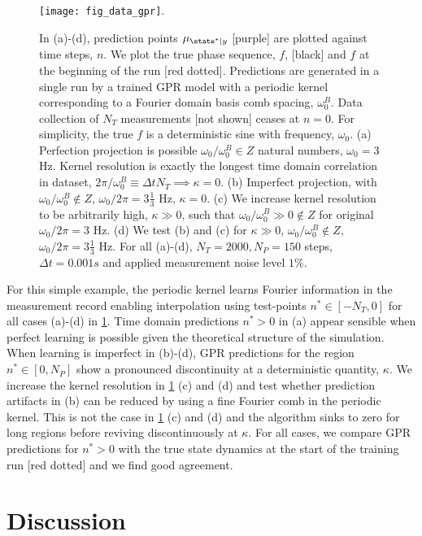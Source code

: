 \begin{figure}
    \texttt{[image: fig\_data\_gpr]}. 
    \caption{\label{fig:main:fig_data_gpr} In (a)-(d), prediction points $\mu_{\state^*|y}$ [purple] are plotted against time steps, $n$. We plot the true phase sequence,  $f$, [black] and  $f$ at the beginning of the run [red dotted]. Predictions are generated in a single run by a trained GPR model with a periodic kernel corresponding to a Fourier domain basis comb spacing, $\omega_0^B$. Data collection of $N_T$ measurements [not shown] ceases at $n=0$. For simplicity, the true $f$ is a deterministic sine with frequency, $\omega_0$. (a) Perfection projection is possible $\omega_0 / \omega_0^B \in Z$ natural numbers, $\omega_0 = 3$ Hz. Kernel resolution is exactly the longest time domain correlation in dataset, $2 \pi / \omega_0^B \equiv \Delta t N_T \implies \kappa = 0$.   (b) Imperfect projection, with $\omega_0 / \omega_0^B \notin Z$, $\omega_0 / 2 \pi = 3 \frac{1}{3}$ Hz, $\kappa=0$. (c) We increase kernel resolution to be arbitrarily high, $\kappa \gg 0 $, such that $\omega_0 / \omega_0^B \gg 0 \notin Z $ for original $ \omega_0 / 2 \pi = 3$ Hz. (d) We test (b) and (c) for $\kappa \gg0$, $ \omega_0 / \omega_0^B \notin Z$, $\omega_0 / 2 \pi = 3 \frac{1}{3}$ Hz. For all (a)-(d), $N_T = 2000, N_P = 150$ steps, $\Delta t = 0.001s$ and applied measurement noise level $1\%$.} 
\end{figure}
For this simple example, the periodic kernel learns Fourier information in the measurement record enabling interpolation using test-points $n^* \in [-N_T, 0]$ for all cases (a)-(d) in \cref{fig:main:fig_data_gpr}. Time domain predictions $n^* >0$  in (a) appear sensible when perfect learning is possible given the theoretical structure of the simulation. When learning is imperfect in (b)-(d), GPR predictions for the region  $n^* \in [0, N_P]$ show a pronounced discontinuity at a deterministic quantity, $\kappa$.  We increase the kernel resolution in \cref{fig:main:fig_data_gpr} (c) and (d) and test whether prediction artifacts in (b) can be reduced by using a fine Fourier comb in the periodic kernel. This is not the case in \cref{fig:main:fig_data_gpr} (c) and (d) and the algorithm sinks to zero for long regions before reviving discontinuously at $\kappa$. For all cases, we compare GPR predictions for $n^*>0$ with the true state dynamics at the start of the training run [red dotted] and we find good agreement. 

\section{Discussion} \label{sec:main:discussion}



